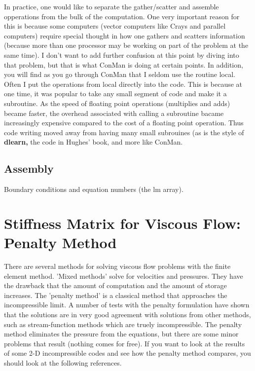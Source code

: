 \documentclass{article}
\begin{document}
In practice, one would like to separate the gather/scatter and assemble
opperations from the bulk of the computation.  One very important reason for
this is because some computers (vector computers like Crays and parallel
computers) require special thought in how one gathers and scatters information
(because more than one processor may be working on part of the problem at the
same time).   I don't want to add further confusion at this point by diving into
that problem, but that is what ConMan is doing at certain points.   In addition,
you will find as you go through ConMan that I seldom use the routine local. 
Often I put the operations from local directly into the code.   This is because
at one time, it was popular to take any small segment of code and make it a
subroutine.  As the speed of floating point operations (multiplies and adds)
became faster, the overhead associated with calling a subroutine bacame
increasingly expensive compared to the cost of a floating point operation.  Thus
code writing moved away from having many small subrouines (as is the style of
{\bf dlearn,} the code in Hughes' book, and more like ConMan.

\subsection{Assembly}

Boundary conditions and equation numbers (the lm array).

\section{Stiffness Matrix for Viscous Flow: Penalty Method}

There are several methods for solving viscous flow problems with the finite
element method.   'Mixed methods' solve for velocities and pressures.   They
have the drawback that the amount of computation and the amount of storage
increases.  The 'penalty method' is a classical method that approaches the
incompressible limit.  A number of tests with the penalty formulation have
shown that the solutions are in very good agreement with solutions from other
methods, such as stream-function methods which are truely incompressible.  The
penalty method eliminates the pressure from the equations, but there are some
minor problems that result (nothing comes for free).   If you want to look at
the results of some 2-D incompressible codes and see how the penalty method
compares, you should look at the following references.
\end{document}

